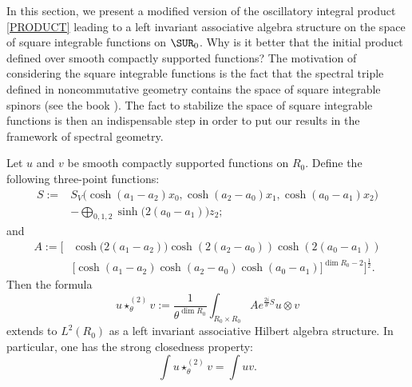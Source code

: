 In this section, we present a modified version of the oscillatory integral product \eqref{PRODUCT} leading to a left invariant associative algebra structure on the space of square integrable functions on $\SUR_0$. Why is it better that the initial product defined over smooth compactly supported functions? The motivation of considering the square integrable functions is the fact that the spectral triple defined in noncommutative geometry contains the space of square integrable spinors (see the book \cite{ConnesNCG}). The fact to stabilize the space of square integrable functions is then an indispensable step in order to put our results in the framework of spectral geometry.

\begin{theorem}

	Let $u$ and $v$ be smooth compactly supported functions on $R_0$. Define the following three-point functions:
	\begin{equation}
		\begin{split}
			S:=& S_V\big(\cosh(a_1-a_2)x_0, \cosh(a_2-a_0)x_1, \cosh(a_0-a_1)x_2\big)\\
			&-\bigoplus_{0,1,2}\sinh\big(2(a_0-a_1)\big)z_2;
		\end{split}
	\end{equation}
	and
	\[
		\begin{split}
			A:= \Big[&\cosh\big(2(a_1-a_2)\big)\cosh(2(a_2- a_0))\cosh(2(a_0-a_1))\\
				& \big[\cosh(a_1-a_2)\cosh(a_2- a_0)\cosh(a_0-a_1)\big]^{\dim R_0-2}\Big]^{\frac{1}{2}}.
		\end{split}
	\]
	Then the formula
	\begin{equation}\label{HILB}
		u\star^{(2)}_\theta v:=\frac{1}{\theta^{\dim R_0}}
		\int_{R_0\times R_0}Ae^{\frac{2i}{\theta}S}u\otimes v
	\end{equation}
	extends to $L^2(R_0)$ as a left invariant associative Hilbert algebra structure. In particular, one has the strong closedness property:
	\begin{equation*}
		\int u\star^{(2)}_\theta v=\int uv.
	\end{equation*}
	\label{thmL2}
\end{theorem}
